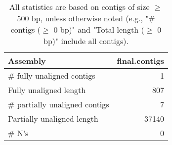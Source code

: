 \documentclass[12pt,a4paper]{article}
\begin{document}
\begin{table}[ht]
\begin{center}
\caption{All statistics are based on contigs of size $\geq$ 500 bp, unless otherwise noted (e.g., "\# contigs ($\geq$ 0 bp)" and "Total length ($\geq$ 0 bp)" include all contigs).}
\begin{tabular}{|l*{1}{|r}|}
\hline
Assembly & final.contigs \\ \hline
\# fully unaligned contigs & 1 \\ \hline
Fully unaligned length & 807 \\ \hline
\# partially unaligned contigs & 7 \\ \hline
Partially unaligned length & 37140 \\ \hline
\# N's & 0 \\ \hline
\end{tabular}
\end{center}
\end{table}
\end{document}
